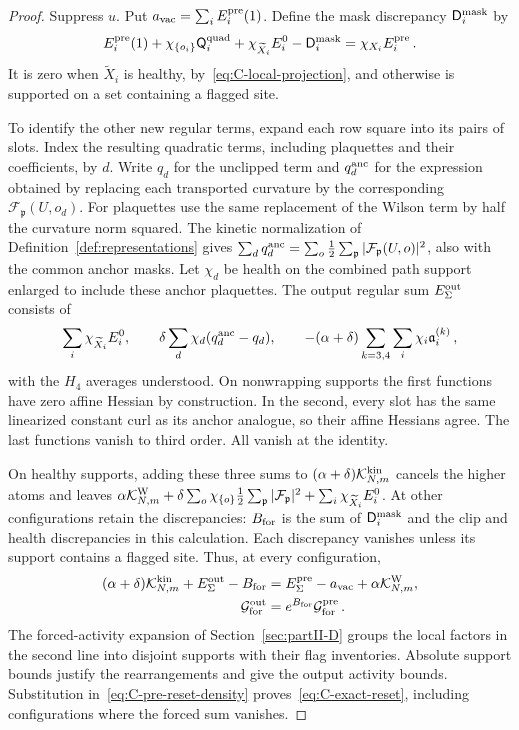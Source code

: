 \begin{proof}
Suppress $u$. Put $a_{\rm vac}=\sum_iE_i^{\rm pre}(1)$. Define the mask discrepancy $\mathsf D_i^{\rm mask}$ by
\begin{equation*}
 E_i^{\rm pre}(1)+\chi_{\{o_i\}}\mathsf Q_i^{\rm quad}
 +\chi_{\widetilde X_i}E_i^0-\mathsf D_i^{\rm mask}=\chi_{X_i}E_i^{\rm pre}\,.
\end{equation*}
It is zero when $\widetilde X_i$ is healthy, by~\eqref{eq:C-local-projection}, and otherwise is supported on a set containing a flagged site.

To identify the other new regular terms, expand each row square into its pairs of slots. Index the resulting quadratic terms, including plaquettes and their coefficients, by $d$. Write $q_d$ for the unclipped term and $q_d^{\rm anc}$ for the expression obtained by replacing each transported curvature by the corresponding $\mathcal F_{\mathfrak p}(U,o_d)$. For plaquettes use the same replacement of the Wilson term by half the curvature norm squared. The kinetic normalization of Definition~\ref{def:representations} gives $\sum_dq_d^{\rm anc}=\sum_o\tfrac12\sum_{\mathfrak p}|\mathcal F_{\mathfrak p}(U,o)|^2$, also with the common anchor masks. Let $\chi_d$ be health on the combined path support enlarged to include these anchor plaquettes. The output regular sum $E_\Sigma^{\rm out}$ consists of
\begin{equation*}
 \sum_i\chi_{\widetilde X_i}E_i^0,
 \qquad \delta\sum_d\chi_d(q_d^{\rm anc}-q_d),
 \qquad -(\alpha+\delta)\sum_{k=3,4}\sum_i\chi_i\mathfrak a_i^{(k)}\,,
\end{equation*}
with the $H_4$ averages understood. On nonwrapping supports the first functions have zero affine Hessian by construction. In the second, every slot has the same linearized constant curl as its anchor analogue, so their affine Hessians agree. The last functions vanish to third order. All vanish at the identity.

On healthy supports, adding these three sums to $(\alpha+\delta)\mathcal K^{\rm kin}_{N,m}$ cancels the higher atoms and leaves $\alpha\mathcal K^{\rm W}_{N,m}+\delta\sum_o\chi_{\{o\}}\tfrac12\sum_{\mathfrak p}|\mathcal F_{\mathfrak p}|^2+\sum_i\chi_{\widetilde X_i}E_i^0$. At other configurations retain the discrepancies: $B_{\rm for}$ is the sum of $\mathsf D_i^{\rm mask}$ and the clip and health discrepancies in this calculation. Each discrepancy vanishes unless its support contains a flagged site. Thus, at every configuration,
\begin{align}\label{eq:C-reorganization}
 (\alpha+\delta)\mathcal K^{\rm kin}_{N,m}+E_\Sigma^{\rm out}-B_{\rm for}
 &=E_\Sigma^{\rm pre}-a_{\rm vac}+\alpha\mathcal K^{\rm W}_{N,m},\nonumber\\
 \mathcal G_{\rm for}^{\rm out}&=e^{B_{\rm for}}\mathcal G_{\rm for}^{\rm pre}\,.
\end{align}
The forced-activity expansion of Section~\ref{sec:partII-D} groups the local factors in the second line into disjoint supports with their flag inventories. Absolute support bounds justify the rearrangements and give the output activity bounds. Substitution in~\eqref{eq:C-pre-reset-density} proves~\eqref{eq:C-exact-reset}, including configurations where the forced sum vanishes.


\end{proof}
